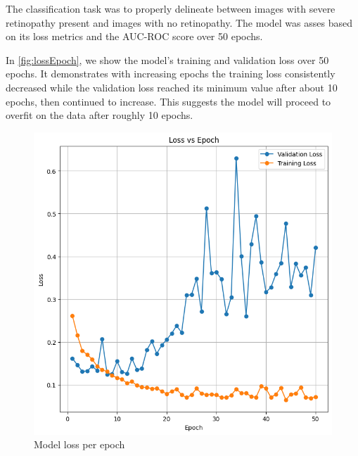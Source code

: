 The classification task was to properly delineate between images with severe retinopathy present and images with no retinopathy. The model was asses based on its loss metrics and the AUC-ROC score over 50 epochs.

In \autoref{fig:lossEpoch}, we show the model's training and validation loss over 50 epochs. It demonstrates with increasing epochs the training loss consistently decreased while the validation loss reached its minimum value after about 10 epochs, then continued to increase. This suggests the model will proceed to overfit on the data after roughly 10 epochs.

\begin{figure}[t]
  \centering
  \begin{minipage}{.5\textwidth}
    \centering
    \includegraphics[scale=0.35]{Images/lossEpoch.png}
    \caption{Model loss per epoch}
    \label{fig:lossEpoch}
  \end{minipage}%
  \begin{minipage}{.5\textwidth}
    \centering

\end{minipage}
\end{figure}

